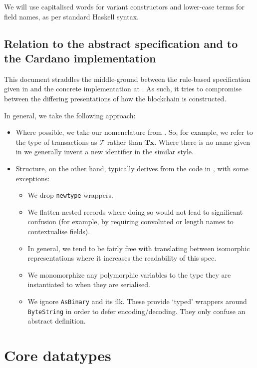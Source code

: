 \documentclass{article}
\newcommand{\txs}{\mathcal{T}}
\begin{document}
We will use capitalised words for variant constructors and lower-case
terms for field names, as per standard Haskell syntax.

\subsection{Relation to the abstract specification and to the Cardano implementation}

This document straddles the middle-ground between the rule-based specification
given in \cite{spiwack} and the concrete implementation at \cite{cardano}. As
such, it tries to compromise between the differing presentations of how the
blockchain is constructed.

In general, we take the following approach:

\begin{itemize}
\item Where possible, we take our nomenclature from \cite{spiwack}. So, for
  example, we refer to the type of transactions as $\txs$ rather than
  $\textbf{Tx}$. Where there is no name given in \cite{spiwack} we generally
  invent a new identifier in the similar style.
\item Structure, on the other hand, typically derives from the code in
  \cite{cardano}, with some exceptions:
  \begin{itemize}
  \item We drop \verb|newtype| wrappers.
  \item We flatten nested records where doing so would not lead to significant
    confusion (for example, by requiring convoluted or length names to
    contextualise fields).
  \item In general, we tend to be fairly free with translating between
    isomorphic representations where it increases the readability of this spec.
  \item We monomorphize any polymorphic variables to the type they are
    instantiated to when they are serialised.
  \item We ignore \verb|AsBinary| and its ilk. These provide `typed' wrappers
    around \verb|ByteString| in order to defer encoding/decoding. They only
    confuse an abstract definition.
  \end{itemize}
\end{itemize}

\section{Core datatypes}
\label{sec:types}
\end{document}
